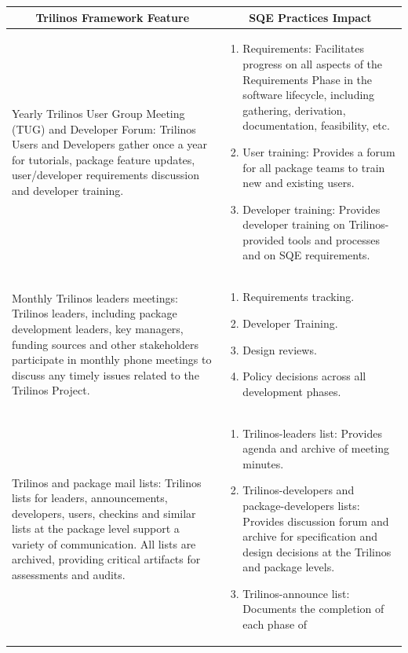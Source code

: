 \documentclass[acmtoms,acmnow]{acmtrans2m}
\begin{document}
\begin{table}
\begin{center}
\begin{tabular}{|p{1.75in}|p{2.75in}|}\hline
\multicolumn{1}{|c|}{Trilinos Framework Feature} &
\multicolumn{1}{|c|}{SQE Practices Impact}\\\hline
Yearly Trilinos User Group Meeting (TUG) and Developer Forum: Trilinos Users
and Developers gather once a year for tutorials, package feature updates,
user/developer requirements discussion and developer training. &  
\begin{enumerate}
\item Requirements: Facilitates progress on all aspects of the Requirements Phase in
the software lifecycle, including gathering, derivation,
documentation, feasibility, etc. 
\item User training: Provides a forum for all package teams to train new and existing
users.
\item Developer training: Provides developer training on Trilinos-provided tools and
processes and on SQE requirements.
\end{enumerate} \\\hline
Monthly Trilinos leaders meetings: Trilinos leaders, including package
development leaders, key managers, funding sources and other
stakeholders participate in monthly phone meetings to discuss any
timely issues related to the Trilinos Project. &
\begin{enumerate}
\item Requirements tracking.
\item Developer Training.
\item Design reviews.
\item Policy decisions across all development phases.
\end{enumerate}\\\hline 
Trilinos and package mail lists:  Trilinos lists for leaders,
announcements, developers, users, checkins and similar lists at the package level
support a variety of communication.  All lists are archived, providing
critical artifacts for assessments and audits. &
\begin{enumerate}
\item Trilinos-leaders list: Provides agenda and archive of meeting minutes.
\item Trilinos-developers and package-developers lists: Provides
discussion forum and archive for specification and design decisions at
the Trilinos and package levels.
\item Trilinos-announce list: Documents the completion of each phase of

\end{enumerate}
\end{tabular}
\end{center}
\end{table}
\end{document}
